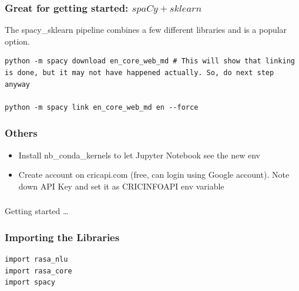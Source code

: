  \begin{frame}[fragile]\frametitle{Great for getting started: $spaCy + sklearn$}
 The spacy\_sklearn pipeline combines a few different libraries and is a popular option.

\begin{lstlisting}
python -m spacy download en_core_web_md # This will show that linking is done, but it may not have happened actually. So, do next step anyway

python -m spacy link en_core_web_md en --force
\end{lstlisting}

\end{frame}

 \begin{frame}[fragile]\frametitle{Others}
\begin{itemize}
\item Install nb\_conda\_kernels to let Jupyter Notebook see the new env
\item Create account on cricapi.com (free, can login using Google account). Note down API Key and set it as CRICINFOAPI env variable
\end{itemize}

\end{frame}


\begin{frame}[fragile]\frametitle{}
\begin{center}
{\Large Getting started \ldots}


\end{center}
\end{frame}



 \begin{frame}[fragile]\frametitle{Importing the Libraries}

\begin{lstlisting}
import rasa_nlu
import rasa_core
import spacy
\end{lstlisting}
\end{frame}


